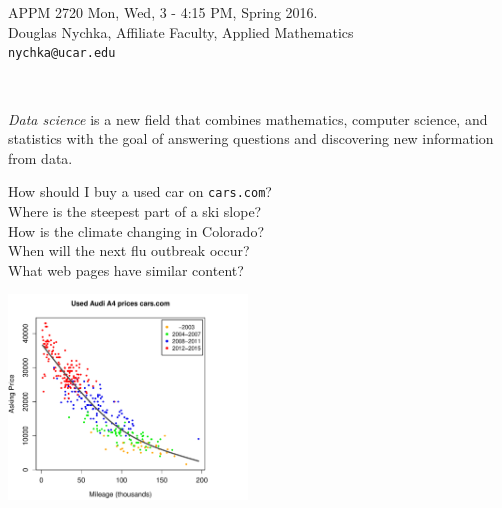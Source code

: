 \documentclass[12pt]{article}
\begin{document}
\vspace*{-1.5in}
{\sf
{ 
\color{red4}
\hspace*{-.5in} \fontsize{40}{50}\selectfont{ 
Introduction to Data Analysis  \\ with R 
}
}
\\
\\
\begin{minipage}{7in}{\Large APPM 2720
Mon, Wed, 3 - 4:15 PM, Spring 2016. \\
 Douglas Nychka, 
Affiliate Faculty, Applied Mathematics  \\
\verb+nychka@ucar.edu+
 }
 \end{minipage}
\\


\begin{minipage}{6.75in}
{\Large
{\it Data science}  is a new field that combines mathematics, computer science, and statistics with the goal of
answering questions and discovering new information from data. 
}
\end{minipage}

%

\begin{minipage}{4.5in}
\vspace*{0in}
{\Large
\bdot How should I buy  a used car on {\tt cars.com}? \\[.125in]
\bdot Where is the steepest part of a ski slope? \\[.125in] 
\bdot How is the climate changing in Colorado? \\[.125in] 
\bdot When will the next flu outbreak occur? \\[.125in] 
\bdot What web pages have similar content?
}
%
\end{minipage}
%
\begin{minipage}{3.in}
\vspace*{0in}
\hspace*{.125in}\includegraphics[width=2.5in]{A4.pdf}
\end{minipage}
\\

}
\end{document}
